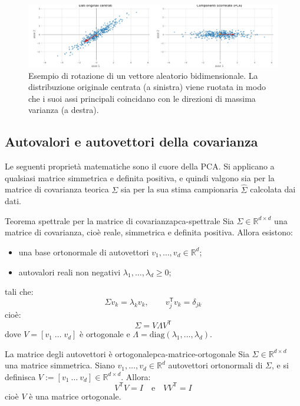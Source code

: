\begin{figure}[H]
    \centering
    \includegraphics[width=\textwidth]{images/th_10_12/rotation_transformation.png}
    \caption{Esempio di rotazione di un vettore aleatorio bidimensionale. La distribuzione originale centrata (a sinistra) viene ruotata in modo che i suoi assi principali coincidano con le direzioni di massima varianza (a destra).}
    \label{fig:rotation_transformation}
\end{figure}

\subsection{Autovalori e autovettori della covarianza}

Le seguenti proprietà matematiche sono il cuore della PCA. Si applicano a
qualsiasi matrice simmetrica e definita positiva, e quindi valgono sia per la
matrice di covarianza teorica \(\Sigma\) sia per la sua stima campionaria
\(\hat{\Sigma}\) calcolata dai dati.

\begin{teorema}{Teorema spettrale per la matrice di covarianza}{pca-spettrale}
Sia \( \Sigma \in \mathbb{R}^{d \times d} \) una matrice di covarianza, cioè
reale, simmetrica e definita positiva. Allora esistono:
\begin{itemize}
  \item una base ortonormale di autovettori \( v_1, \dots, v_d \in \mathbb{R}^d
  \);
  \item autovalori reali non negativi \( \lambda_1, \dots, \lambda_d \geq 0 \);
\end{itemize}
tali che:
\[
\Sigma v_k = \lambda_k v_k, \qquad v_j^\mathsf{T} v_k = \delta_{jk}
\]
cioè:
\[
\Sigma = V \Lambda V^\mathsf{T}
\]
dove \( V = [v_1 \; \dots \; v_d] \) è ortogonale e \( \Lambda =
\mathrm{diag}(\lambda_1, \dots, \lambda_d) \).
\end{teorema}

\begin{proposizione}{La matrice degli autovettori è
ortogonale}{pca-matrice-ortogonale}
Sia \( \Sigma \in \mathbb{R}^{d \times d} \) una matrice simmetrica. Siano \(
v_1, \dots, v_d \in \mathbb{R}^d \) autovettori ortonormali di \( \Sigma \), e
si definisca \( V := [v_1 \ \dots \ v_d] \in \mathbb{R}^{d \times d} \). Allora:
\[
V^\mathsf{T} V = I \quad \text{e} \quad VV^\mathsf{T} = I
\]
cioè \( V \) è una matrice ortogonale.
\end{proposizione}

